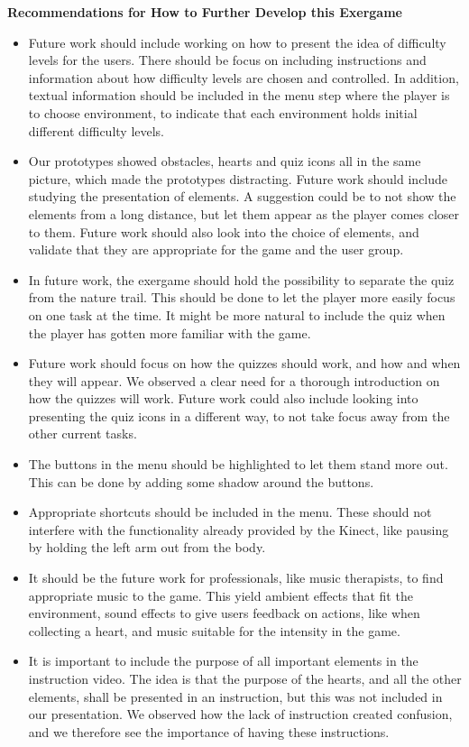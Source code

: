 \textbf{Recommendations for How to Further Develop this Exergame}
\begin{itemize}
\renewcommand{\labelitemi}{$\bullet$}
\item Future work should include working on how to present the idea of difficulty levels for the users. There should be focus on including instructions and information about how difficulty levels are chosen and controlled. In addition, textual information should be included in the menu step where the player is to choose environment, to indicate that each environment holds initial different difficulty levels.  
\item Our prototypes showed obstacles, hearts and quiz icons all in the same picture, which made the prototypes distracting. Future work should include studying the presentation of elements. A suggestion could be to not show the elements from a long distance, but let them appear as the player comes closer to them. Future work should also look into the choice of elements, and validate that they are appropriate for the game and the user group. 
\item In future work, the exergame should hold the possibility to separate the quiz from the nature trail. This should be done to let the player more easily focus on one task at the time. It might be more natural to include the quiz when the player has gotten more familiar with the game.
\item Future work should focus on how the quizzes should work, and how and when they will appear. We observed a clear need for a thorough introduction on how the quizzes will work. Future work could also include looking into presenting the quiz icons in a different way, to not take focus away from the other current tasks. 
\item The buttons in the menu should be highlighted to let them stand more out. This can be done by adding some shadow around the buttons.
\item Appropriate shortcuts should be included in the menu. These should not interfere with the functionality already provided by the Kinect, like pausing by holding the left arm out from the body.
\item It should be the future work for professionals, like music therapists, to find appropriate music to the game. This yield ambient effects that fit the environment, sound effects to give users feedback on actions, like when collecting a heart, and music suitable for the intensity in the game.  
\item It is important to include the purpose of all important elements in the instruction video. The idea is that the purpose of the hearts, and all the other elements, shall be presented in an instruction, but this was not included in our presentation. We observed how the lack of instruction created confusion, and we therefore see the importance of having these instructions.  

\end{itemize}
